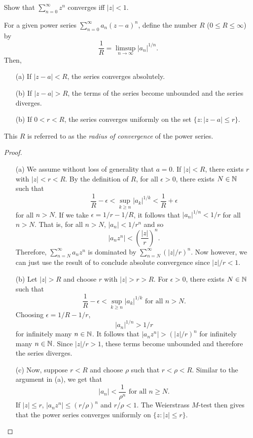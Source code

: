 	\begin{exercise}
		\label{ex: conv of summ zn}
		Show that $\sum_{n=0}^\infty z^n$ converges iff $|z| < 1$.
	\end{exercise}

	\begin{ftheo}
		For a given power series $\sum_{n=0}^\infty a_n (z-a)^n$, define the number $R$ ($0\le R\le \infty$) by
		\[ \frac{1}{R} = \limsup_{n\to\infty} |a_n|^{1/n}. \]
		Then,
		\begin{itemize}
			\item[(a)] If $|z-a| < R$, the series converges absolutely.
			\item[(b)] If $|z-a| > R$, the terms of the series become unbounded and the series diverges.
			\item[(b)] If $0 < r < R$, the series converges uniformly on the set $\{ z : |z-a| \le r \}$.
		\end{itemize}
	\end{ftheo}

	This $R$ is referred to as the \emph{radius of convergence} of the power series.

	\begin{proof}
		\phantom{easter}
		\begin{itemize}
			\item[(a)]
			We assume without loss of generality that $a = 0$. If $|z| < R$, there exists $r$ with $|z| < r < R$. By the definition of $R$, for all $\epsilon>0$, there exists $N \in \mathbb{N}$ such that
			\[ \frac{1}{R} - \epsilon < \sup_{k \ge n} |a_k|^{1/k} < \frac{1}{R} + \epsilon \]
			for all $n > N$. If we take $\epsilon = 1/r - 1/R$, it follows that $|a_n|^{1/n} < 1/r$ for all $n > N$. That is, for all $n > N$, $|a_n| < 1/r^n$ and so 
			\[ |a_n z^n| < \left(\frac{|z|}{r}\right)^n. \]
			Therefore, $\sum_{n=N}^\infty a_n z^n$ is dominated by $\sum_{n=N}^\infty (|z|/r)^n$. Now however, we can just use the result of  to conclude absolute convergence since $|z|/r < 1$.
			
			\item[(b)]
			Let $|z| > R$ and choose $r$ with $|z| > r > R$. For $\epsilon > 0$, there exists $N \in \mathbb{N}$ such that
			\[ \frac{1}{R} - \epsilon < \sup_{k \ge n} |a_k|^{1/k} \text{ for all $n > N$}. \]
			Choosing $\epsilon = 1/R - 1/r$,
			\[ |a_n|^{1/n} > 1/r \]
			for infinitely many $n \in \mathbb{N}$. It follows that $|a_n z^n| > (|z|/r)^n$ for infinitely many $n \in \mathbb{N}$. Since $|z|/r > 1$, these terms become unbounded and therefore the series diverges.

			\item[(c)]
			Now, suppose $r<R$ and choose $\rho$ such that $r<\rho<R$. Similar to the argument in (a), we get that
			\[ |a_n| < \frac{1}{\rho^n} \text{ for all $n\ge N$.} \]
			If $|z| \le r$, $|a_n z^n| \le (r/\rho)^n$ and $r/\rho < 1$. The Weierstrass $M$-test then gives that the power series converges uniformly on $\{z : |z| \le r\}$. \qedhere
		\end{itemize}
	\end{proof}

